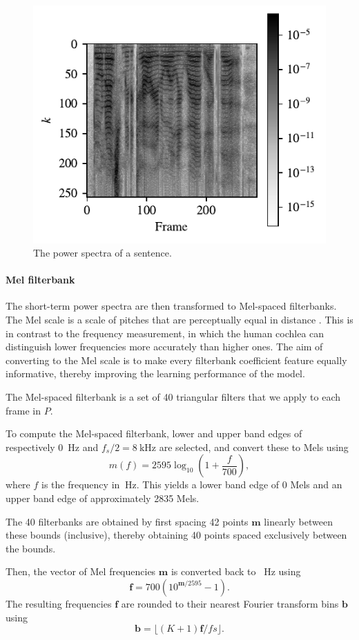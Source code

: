 			\begin{figure}[ht]
				\centering
			    \includegraphics[width=0.45\linewidth]{gfx/powframes}
			    \caption[Power spectra]{The power spectra of a sentence.}
			    \label{fig:powframes}
			\end{figure}

		\paragraph{Mel filterbank}

			The short-term power spectra are then transformed to Mel-spaced filterbanks.
			The Mel scale is a scale of pitches that are perceptually equal in distance \citep{stevens1937scale}.
			This is in contrast to the frequency measurement, in which the human cochlea can distinguish lower frequencies more accurately than higher ones.
			The aim of converting to the Mel scale is to make every filterbank coefficient feature equally informative, thereby improving the learning performance of the model.

			The Mel-spaced filterbank is a set of 40 triangular filters that we apply to each frame in $P$.

			To compute the Mel-spaced filterbank, lower and upper band edges of respectively \SI{0}{\Hz} and $f_s/2 = \SI{8}{\kHz}$ are selected, and convert these to Mels using
			\begin{equation}
				m(f) = 2595\log_{10}\left(1 + \frac{f}{700}\right),
			\end{equation}
			where $f$ is the frequency in $\SI{}{\Hz}$.
			This yields a lower band edge of 0 Mels and an upper band edge of approximately 2835 Mels.

			The 40 filterbanks are obtained by first spacing 42 points $\mathbf{m}$ linearly between these bounds (inclusive), thereby obtaining 40 points spaced exclusively between the bounds.

			Then, the vector of Mel frequencies $\mathbf{m}$ is converted back to \SI{}{\Hz} using
			\begin{equation}
				\mathbf{f} = 700\left(10^{\mathbf{m}/2595}-1\right).
			\end{equation}
			The resulting frequencies $\mathbf{f}$ are rounded to their nearest Fourier transform bins $\mathbf{b}$ using
			\begin{equation}
				\mathbf{b} = \lfloor(K+1)\mathbf{f}/fs\rfloor.
			\end{equation}

